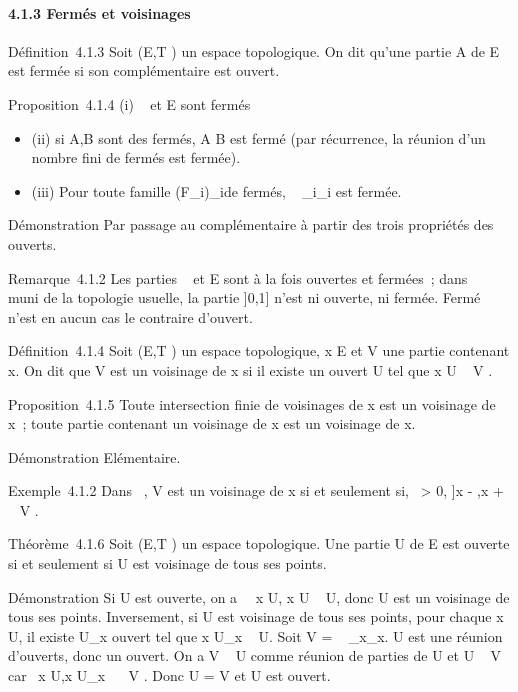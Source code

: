 \documentclass[]{article}
\begin{document}
\paragraph{4.1.3 Fermés et voisinages}

Définition~4.1.3 Soit (E,T ) un espace topologique. On dit qu'une partie
A de E est fermée si son complémentaire est ouvert.

Proposition~4.1.4 (i) \varnothing~ et E sont fermés

\begin{itemize}
\itemsep1pt\parskip0pt
\item
  (ii) si A,B sont des fermés, A \cup B est fermé (par récurrence, la
  réunion d'un nombre fini de fermés est fermée).
\item
  (iii) Pour toute famille (F\_i)\_i\inI de fermés,
  \⋂ ~
  \_i\inIF\_i est fermée.
\end{itemize}

Démonstration Par passage au complémentaire à partir des trois
propriétés des ouverts.

Remarque~4.1.2 Les parties \varnothing~ et E sont à la fois ouvertes et fermées~;
dans ~ muni de la topologie usuelle, la partie {]}0,1{]} n'est ni
ouverte, ni fermée. Fermé n'est en aucun cas le contraire d'ouvert.

Définition~4.1.4 Soit (E,T ) un espace topologique, x \in E et V une
partie contenant x. On dit que V est un voisinage de x si il existe un
ouvert U tel que x \in U \subset~ V .

Proposition~4.1.5 Toute intersection finie de voisinages de x est un
voisinage de x~; toute partie contenant un voisinage de x est un
voisinage de x.

Démonstration Elémentaire.

Exemple~4.1.2 Dans ~, V est un voisinage de x si et seulement si,
\exists~\epsilon \textgreater{} 0, {]}x - \epsilon,x + \epsilon{[}\subset~ V .

Théorème~4.1.6 Soit (E,T ) un espace topologique. Une partie U de E est
ouverte si et seulement si U est voisinage de tous ses points.

Démonstration Si U est ouverte, on a \forall~~x \in U, x
\in U \subset~ U, donc U est un voisinage de tous ses points. Inversement, si U
est voisinage de tous ses points, pour chaque x \in U, il existe
U\_x ouvert tel que x \in U\_x \subset~ U. Soit V
= \⋃ ~
\_x\inUU\_x. U est une réunion d'ouverts, donc un ouvert. On
a V \subset~ U comme réunion de parties de U et U \subset~ V car
\forall~x \in U,x \in U\_x~ \subset~ V . Donc U = V et U
est ouvert.
\end{document}
